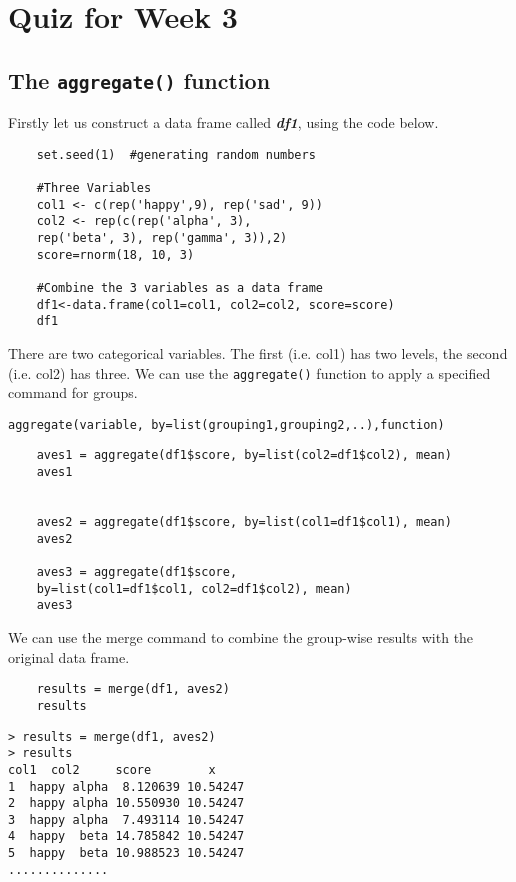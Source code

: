 \documentclass[12pt]{article}
\begin{document}
\section{Quiz for Week 3}


\newpage
\subsection*{The \texttt{aggregate()} function}
Firstly let us construct a data frame called \textit{\textbf{df1}}, using the code below.
\begin{framed}
	\begin{verbatim}
	set.seed(1)  #generating random numbers
	
	#Three Variables
	col1 <- c(rep('happy',9), rep('sad', 9)) 
	col2 <- rep(c(rep('alpha', 3), 
	rep('beta', 3), rep('gamma', 3)),2) 
	score=rnorm(18, 10, 3) 
	
	#Combine the 3 variables as a data frame
	df1<-data.frame(col1=col1, col2=col2, score=score) 
	df1
	\end{verbatim}
\end{framed}
\noindent There are two categorical variables. The first (i.e. col1) has two levels, the second (i.e. col2) has three. We can use the \texttt{aggregate()} function to apply a specified command for groups.

\begin{verbatim}
aggregate(variable, by=list(grouping1,grouping2,..),function)
\end{verbatim}
\begin{framed}
	\begin{verbatim}
	aves1 = aggregate(df1$score, by=list(col2=df1$col2), mean)
	aves1
	
	
	aves2 = aggregate(df1$score, by=list(col1=df1$col1), mean)
	aves2
	
	aves3 = aggregate(df1$score,
	by=list(col1=df1$col1, col2=df1$col2), mean)
	aves3
	\end{verbatim}
\end{framed}
We can use the merge command to combine the group-wise results with the original data frame.
\begin{framed}
	\begin{verbatim}
	results = merge(df1, aves2) 
	results
	\end{verbatim}
\end{framed}

\begin{verbatim}
> results = merge(df1, aves2) 
> results
col1  col2     score        x
1  happy alpha  8.120639 10.54247
2  happy alpha 10.550930 10.54247
3  happy alpha  7.493114 10.54247
4  happy  beta 14.785842 10.54247
5  happy  beta 10.988523 10.54247
..............
\end{verbatim}
\newpage
\end{document}
